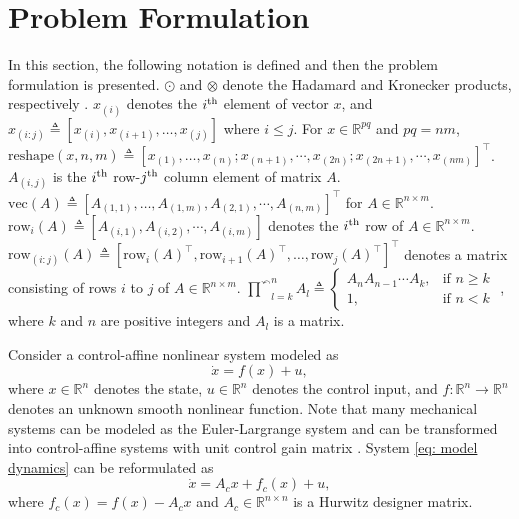\documentclass{l4dc2025}
\begin{document}
\section{Problem Formulation}

In this section, the following notation is defined and then the problem formulation is presented.
$\odot$ and $\otimes$ denote the Hadamard and Kronecker products, respectively \cite{BookMatrix}.
$x_{(i)}$ denotes the $i\textsuperscript{th}$ element of vector $x$, and $x_{(i:j)}\triangleq [x_{(i)},x_{(i+1)},\dots,x_{(j)}]$ where $i \le j$.    
For $x\in\mathbb{R}^{pq}$ and $pq=nm$, $\text{reshape}(x, n, m) \triangleq[x_{(1)},\dots,x_{(n)};x_{(n+1)},\cdots,x_{(2n)};x_{(2n+1)},\cdots,x_{(nm)}]^\top$.    
$A_{(i,j)}$ is the $i\textsuperscript{th}$ row-$j\textsuperscript{th}$ column element of matrix $A$.
$\text{vec}(A)\triangleq [A_{(1,1)},\dots,A_{(1,m)},A_{(2,1)},\cdots,A_{(n,m)}]^\top  $ for $A\in\mathbb{R}^{n\times m}$.
$\text{row}_i(A) \triangleq [A_{(i,1)},A_{(i,2)},\cdots,A_{(i,m)}]$ denotes the $i\textsuperscript{th}$ row of $A\in\mathbb{R}^{n\times m}$.
$\text{row}_{(i:j)} (A) \triangleq [\text{row}_i(A)^\top  , \text{row}_{i+1}(A)^\top  ,\dots,\text{row}_{j}(A)^\top  ]^\top  $ denotes a matrix consisting of rows $i$ to $j$ of $A\in\mathbb{R}^{n\times m}$.
$\overset{\curvearrowleft}\prod^{n}_{l=k} A_l \triangleq 
    {
        \begin{cases}
            {A_n}{A_{n - 1}} \cdots {A_k}, &{\text{if }}n \ge k
            \\
            1, &{\text{if }}n < k
        \end{cases}
}$
, where $k$ and $n$ are positive integers and $A_l$ is a matrix.


Consider a control-affine nonlinear system modeled as 
\begin{equation}
    \dot x = f(x) + u,
    \label{eq: model dynamics}
\end{equation}
where $x\in \mathbb{R}^n$ denotes the state, $u\in\mathbb{R}^n$ denotes the control input, and $f:\mathbb{R}^n\to\mathbb{R}^n$ denotes an unknown smooth nonlinear function. 
Note that many mechanical systems can be modeled as the Euler-Largrange system and can be transformed into control-affine systems with unit control gain matrix \cite{Ryu_2024}.
System \eqref{eq: model dynamics} can be reformulated as 
\begin{equation}
    \dot x = A_c x + f_c(x) + u,
    \label{eq: reformed dynamics}
\end{equation}
where $f_c(x)= f(x) - A_c x$ and $A_c\in\mathbb{R}^{n\times n}$ is a Hurwitz designer matrix. 
\end{document}
